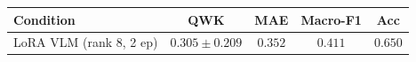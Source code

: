 \begin{tabular}{lcccc}
\toprule
Condition & QWK & MAE & Macro-F1 & Acc \\
\midrule
LoRA VLM (rank 8, 2 ep) & $0.305\pm0.209$ & $0.352$ & $0.411$ & $0.650$ \\
\bottomrule
\end{tabular}